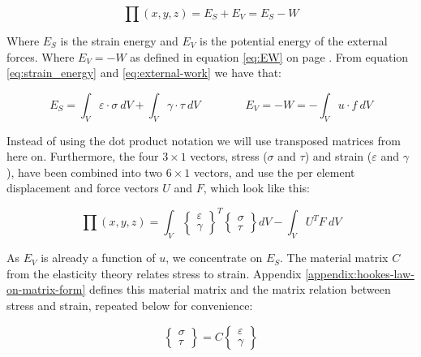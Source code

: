 \begin{equation}
\prod (x,y,z) = E_S + E_V = E_S - W
\end{equation}

Where $E_S$ is the strain energy and $E_V$ is the potential energy of
the external forces. Where $E_V = -W$ as defined in equation
\eqref{eq:EW} on page \pageref{eq:EW}. From equation
\eqref{eq:strain_energy} and \eqref{eq:external-work} we have that:

\begin{equation*}
E_S =  \int_V \varepsilon \cdot \sigma \ dV
+ \int_V \gamma \cdot \tau \ dV
\qquad \qquad E_V = - W = - \int_V u \cdot f \ dV
\end{equation*}

Instead of using the dot product notation we will use transposed
matrices from here on. Furthermore, the four $3 \times 1$ vectors,
stress ($\sigma$ and $\tau$) and strain ($\varepsilon$ and $\gamma$),
have been combined into two $6 \times 1$ vectors, and use the per
element displacement and force vectors $U$ and $F$, which look like
this:

\begin{equation}
\prod (x,y,z) =  \int_V 
\begin{Bmatrix}
\varepsilon \\
\gamma
\end{Bmatrix}
^T
\begin{Bmatrix}
\sigma \\
\tau
\end{Bmatrix}
dV - \int_V U^T F \ dV
\end{equation}

As $E_V$ is already a function of $u$, we concentrate on $E_S$.
The material matrix $C$ from the elasticity theory relates
stress to strain. Appendix \ref{appendix:hookes-law-on-matrix-form}
defines this material matrix and the matrix relation between stress
and strain, repeated below for convenience:

\begin{equation*}
\begin{Bmatrix}
\sigma \\
\tau
\end{Bmatrix}
= C 
\begin{Bmatrix}
\varepsilon \\
\gamma
\end{Bmatrix}
\end{equation*}

